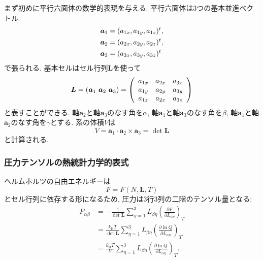 まず初めに平行六面体の数学的表現を与える. 
平行六面体は3つの基本並進ベクトル
\begin{align}
\bm{a}_{1} &= (a_{1x}, a_{1y}, a_{1z})^{t}, \notag \\
\bm{a}_{2} &= (a_{2x}, a_{2y}, a_{2z})^{t}, \notag \\
\bm{a}_{3} &= (a_{3x}, a_{3y}, a_{3z})^{t}   \notag
\end{align}
で張られる. 
基本セルはセル行列$\bm{L}$を使って
\begin{align}
\bm{L}
=
\left(\bm{a}_{1}~ \bm{a}_{2}~ \bm{a}_{3} \right)
=
\left(
       \begin{array}{ccc}
        a_{1x} & a_{2x} & a_{3x} \\
        a_{1y} & a_{2y} & a_{3y} \\
        a_{1z} & a_{2z} & a_{3z} \\
       \end{array}
\right)
\notag
\end{align}
と表すことができる.
軸$\bm{a}_{2}$と軸$\bm{a}_{3}$のなす角を$\alpha$,
軸$\bm{a}_{1}$と軸$\bm{a}_{3}$のなす角を$\beta$,
軸$\bm{a}_{1}$と軸$\bm{a}_{2}$のなす角を$\gamma$とする.
系の体積$V$は
\begin{equation}
  V = \bm{a}_{1} \cdot \bm{a}_{2} \times \bm{a}_{3}
    = \det \bm{L}
\end{equation}
と計算される.


\subsubsection{圧力テンソルの熱統計力学的表式}

ヘルムホルツの自由エネルギーは
\begin{equation}
  F = F(N, \bm{L}, T)
\end{equation}
とセル行列に依存する形になるため, 圧力は3行3列の二階のテンソル量となる:
\begin{align}
  P_{\alpha\beta}
 &=
  -\frac{1}{\det \bm{L}}
  \sum_{\eta = 1}^{3} L_{\beta\eta}
  \left(\frac{\partial F}{\partial L_{\alpha\eta}} \right)_{T}
  \label{Eq:pressure-tensor1}
  \\
 &=
  \frac{k_{\mathrm{B}}T}{\det \bm{L}}
  \sum_{\eta = 1}^{3} L_{\beta\eta}
  \left(\frac{\partial \ln Q}{\partial L_{\alpha\eta}} \right)_{T}
  \\
 &=
  \frac{k_{\mathrm{B}}T}{V}
  \sum_{\eta = 1}^{3} L_{\beta\eta}
  \left(\frac{\partial \ln Q}{\partial L_{\alpha\eta}} \right)_{T}.
\end{align}

